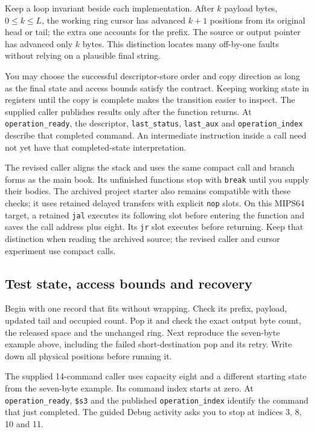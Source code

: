 Keep a loop invariant beside each implementation. After $k$ payload bytes,
$0\leq k\leq L$, the working ring cursor has advanced $k+1$ positions from its
original head or tail; the extra one accounts for the prefix. The source or output
pointer has advanced only $k$ bytes. This distinction locates many off-by-one
faults without relying on a plausible final string.

You may choose the successful descriptor-store order and copy direction as long
as the final state and access bounds satisfy the contract. Keeping working state
in registers until the copy is complete makes the transition easier to inspect.
The supplied caller publishes results only after the function returns. At
\texttt{operation\_ready}, the descriptor, \texttt{last\_status},
\texttt{last\_aux} and \texttt{operation\_index} describe that completed command.
An intermediate instruction inside a call need not yet have that completed-state
interpretation.

The revised caller aligns the stack and uses the same compact call and branch
forms as the main book. Its unfinished functions stop with \texttt{break} until
you supply their bodies. The archived project starter also remains compatible
with these checks; it uses retained delayed transfers with explicit \texttt{nop}
slots. On this MIPS64 target, a retained \texttt{jal} executes its following slot
before entering the function and saves the call address plus eight. Its
\texttt{jr} slot executes before returning. Keep that distinction when reading
the archived source; the revised caller and cursor experiment use compact calls.

\subsection*{Test state, access bounds and recovery}

Begin with one record that fits without wrapping. Check its prefix, payload, updated
tail and occupied count. Pop it and check the exact output byte count, the released
space and the unchanged ring. Next reproduce the seven-byte example above, including
the failed short-destination pop and its retry. Write down all physical positions
before running it.

The supplied 14-command caller uses capacity eight and a different starting state
from the seven-byte example. Its command index starts at zero. At
\texttt{operation\_ready}, \texttt{\$s3} and the published
\texttt{operation\_index} identify the command that just completed. The guided
Debug activity asks you to stop at indices 3, 8, 10 and 11.

